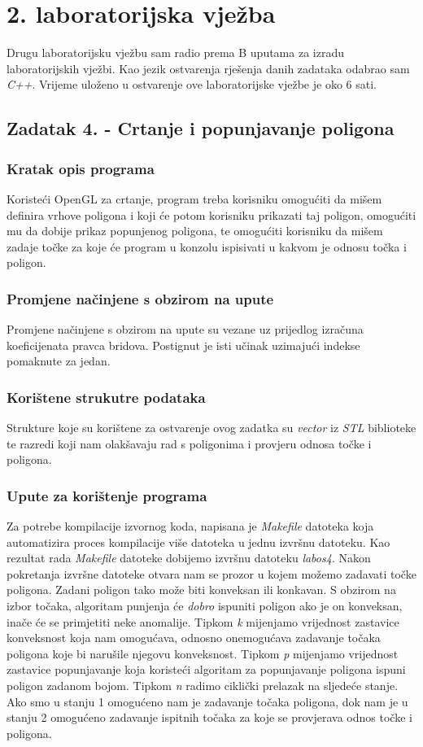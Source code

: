 \documentclass{report}
\begin{document}
\chapter{2. laboratorijska vježba}
Drugu laboratorijsku vježbu sam radio prema B uputama za izradu laboratorijskih vježbi. Kao jezik ostvarenja rješenja danih zadataka odabrao sam \textit{C++}. Vrijeme uloženo u ostvarenje ove laboratorijske vježbe je oko 6 sati. 

\section{Zadatak 4. - Crtanje i popunjavanje poligona}
\subsection{Kratak opis programa}
Koristeći OpenGL za crtanje, program treba korisniku omogućiti da mišem definira vrhove poligona i koji će potom korisniku prikazati taj poligon, omogućiti mu da dobije prikaz popunjenog poligona, te omogućiti korisniku da mišem zadaje točke za koje će program u konzolu ispisivati u kakvom je odnosu točka i poligon.

\subsection{Promjene načinjene s obzirom na upute}
Promjene načinjene s obzirom na upute su vezane uz prijedlog izračuna koeficijenata pravca bridova. Postignut je isti učinak uzimajući indekse pomaknute za jedan.

\subsection{Korištene strukutre podataka}
Strukture koje su korištene za ostvarenje ovog zadatka su \textit{vector} iz \textit{STL} biblioteke te razredi koji nam olakšavaju rad s poligonima i provjeru odnosa točke i poligona.

\subsection{Upute za korištenje programa}
Za potrebe kompilacije izvornog koda, napisana je \textit{Makefile} datoteka koja automatizira proces kompilacije više datoteka u jednu izvršnu datoteku. Kao rezultat rada \textit{Makefile} datoteke dobijemo izvršnu datoteku \textit{labos4}. Nakon pokretanja izvršne datoteke otvara nam se prozor u kojem možemo zadavati točke poligona. Zadani poligon tako može biti konveksan ili konkavan. S obzirom na izbor točaka, algoritam punjenja će \textit{dobro} ispuniti poligon ako je on konveksan, inače će se primjetiti neke anomalije. Tipkom \textit{k} mijenjamo vrijednost zastavice konveksnost koja nam omogućava, odnosno onemogućava zadavanje točaka poligona koje bi narušile njegovu konveksnost. Tipkom \textit{p} mijenjamo vrijednost zastavice popunjavanje koja koristeći algoritam za popunjavanje poligona ispuni poligon zadanom bojom. Tipkom \textit{n} radimo ciklički prelazak na sljedeće stanje. Ako smo u stanju 1 omogućeno nam je zadavanje točaka poligona, dok nam je u stanju 2 omogućeno zadavanje ispitnih točaka za koje se provjerava odnos točke i poligona.
\end{document}
